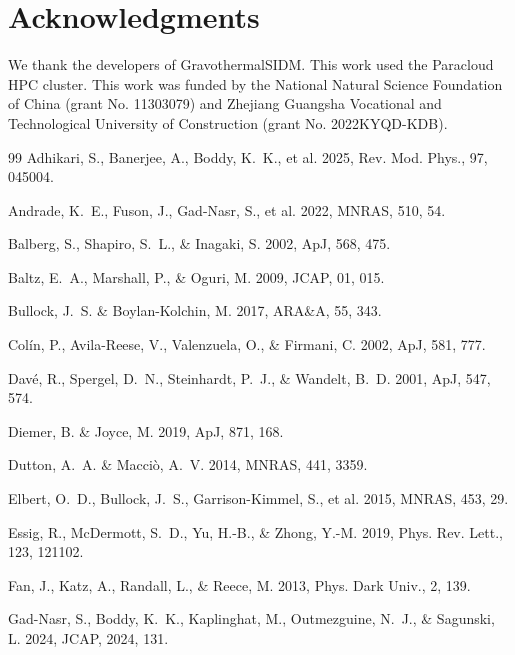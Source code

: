 \documentclass[12pt]{iopart}
\begin{document}
\section*{Acknowledgments}
We thank the developers of GravothermalSIDM.  This work used the Paracloud HPC
cluster.  This work was funded by the National Natural Science Foundation of
China (grant No. 11303079) and Zhejiang Guangsha Vocational and Technological
University of Construction (grant No. 2022KYQD-KDB).

\begin{thebibliography}{99}
Adhikari, S., Banerjee, A., Boddy, K.~K., et al. 2025,
Rev. Mod. Phys., 97, 045004.

Andrade, K.~E., Fuson, J., Gad-Nasr, S., et al. 2022, MNRAS, 510, 54.

Balberg, S., Shapiro, S.~L., \& Inagaki, S. 2002, ApJ, 568, 475.

Baltz, E.~A., Marshall, P., \& Oguri, M. 2009, JCAP, 01, 015.

Bullock, J.~S. \& Boylan-Kolchin, M. 2017, ARA\&A, 55, 343.

Col\'in, P., Avila-Reese, V., Valenzuela, O., \& Firmani, C. 2002,
ApJ, 581, 777.

Dav\'e, R., Spergel, D.~N., Steinhardt, P.~J., \& Wandelt, B.~D. 2001,
ApJ, 547, 574.

Diemer, B. \& Joyce, M. 2019, ApJ, 871, 168.

Dutton, A.~A. \& Macci\`o, A.~V. 2014, MNRAS, 441, 3359.

Elbert, O.~D., Bullock, J.~S., Garrison-Kimmel, S., et al. 2015,
MNRAS, 453, 29.

Essig, R., McDermott, S.~D., Yu, H.-B., \& Zhong, Y.-M. 2019,
Phys. Rev. Lett., 123, 121102.

Fan, J., Katz, A., Randall, L., \& Reece, M. 2013,
Phys. Dark Univ., 2, 139.

Gad-Nasr, S., Boddy, K.~K., Kaplinghat, M., Outmezguine, N.~J., \&
Sagunski, L. 2024, JCAP, 2024, 131.


\end{thebibliography}
\end{document}
